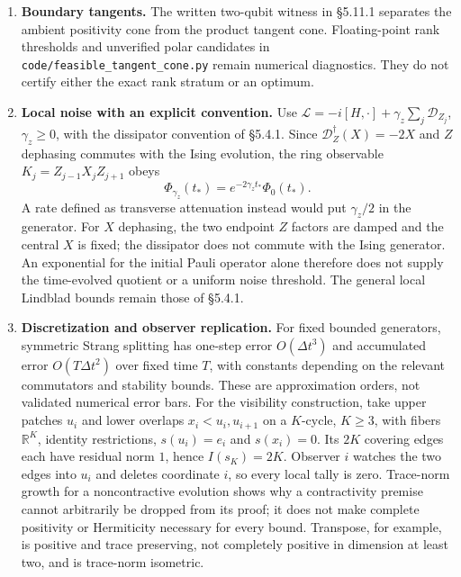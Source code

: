 \documentclass[
  11pt,
]{article}
\begin{document}
\begin{enumerate}
  marginal at graph-state time is \((I+X\otimes X)/4\), with product defect
  \(1\), while every edge marginal is \(I_4/4\). Filling plaquettes does not
  imply that every non-exact 1-cochain has nonzero curvature: on a square
  torus, the cochain equal to \(1\) on positively oriented horizontal edges
  and \(0\) on vertical edges is closed and has a nonzero horizontal period.
  Curvature detects nonclosedness. It detects every non-exact class only
  when \(H^1=0\); otherwise §7.7 requires the additional cohomology report.
\item
  \textbf{Boundary tangents.} The written two-qubit witness in §5.11.1 separates
  the ambient positivity cone from the product tangent cone. Floating-point
  rank thresholds and unverified polar candidates in
  \texttt{code/feasible\_tangent\_cone.py} remain numerical diagnostics. They do not
  certify either the exact rank stratum or an optimum.
\item
  \textbf{Local noise with an explicit convention.} Use
  \(\mathcal L=-i[H,\cdot]+\gamma_z\sum_j\mathcal D_{Z_j}\),
  \(\gamma_z\ge0\), with the dissipator convention of §5.4.1. Since
  \(\mathcal D_Z^\dagger(X)=-2X\) and \(Z\) dephasing commutes with the Ising
  evolution, the ring observable \(K_j=Z_{j-1}X_jZ_{j+1}\) obeys
  \[
  \Phi_{\gamma_z}(t_*)=e^{-2\gamma_z t_*}\Phi_0(t_*).
  \]
  A rate defined as transverse attenuation instead would put
  \(\gamma_z/2\) in the generator. For \(X\) dephasing, the two endpoint \(Z\)
  factors are damped and the central \(X\) is fixed; the dissipator does not
  commute with the Ising generator. An exponential for the initial Pauli
  operator alone therefore does not supply the time-evolved quotient or
  a uniform noise threshold. The general local Lindblad bounds remain
  those of §5.4.1.
\item
  \textbf{Discretization and observer replication.} For fixed bounded generators,
  symmetric Strang splitting has one-step error \(O(\Delta t^3)\) and
  accumulated error \(O(T\Delta t^2)\) over fixed time \(T\), with constants
  depending on the relevant commutators and stability bounds. These are
  approximation orders, not validated numerical error bars. For the
  visibility construction, take upper patches \(u_i\) and lower overlaps
  \(x_i<u_i,u_{i+1}\) on a \(K\)-cycle, \(K\ge3\), with fibers \(\mathbb R^K\),
  identity restrictions, \(s(u_i)=e_i\) and \(s(x_i)=0\). Its \(2K\) covering
  edges each have residual norm \(1\), hence \(I(s_K)=2K\). Observer \(i\)
  watches the two edges into \(u_i\) and deletes coordinate \(i\), so every
  local tally is zero.
  Trace-norm growth for a noncontractive evolution shows why a
  contractivity premise cannot arbitrarily be dropped from its proof; it does
  not make complete positivity or Hermiticity necessary for every bound.
  Transpose, for example, is positive and trace preserving, not completely
  positive in dimension at least two, and is trace-norm isometric.
\end{enumerate}
\end{document}
